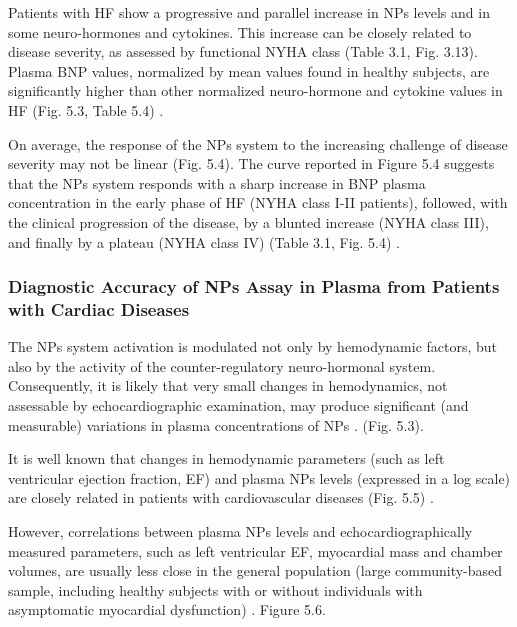 \documentclass[14pt,a4paper,onecolumn]{extarticle}
\begin{document}
Patients with HF show a progressive and parallel increase in NPs levels and in some neuro-hormones and cytokines. This increase can be closely related to disease severity, as assessed by functional NYHA class (Table 3.1, Fig. 3.13). Plasma BNP values, normalized by mean values found in healthy subjects, are significantly higher than other normalized neuro-hormone and cytokine values in HF (Fig. 5.3, Table 5.4) \citep{bib360}.



On average, the response of the NPs system to the increasing challenge of disease severity may not be linear (Fig. 5.4). The curve reported in Figure 5.4 suggests that the NPs system responds with a sharp increase in BNP plasma concentration in the early phase of HF (NYHA class I-II patients), followed, with the clinical progression of the disease, by a blunted increase (NYHA class III), and finally by a plateau (NYHA class IV) (Table 3.1, Fig. 5.4) \citep{bib333}.



\subsubsection{ Diagnostic Accuracy of NPs Assay in Plasma from Patients with Cardiac Diseases}



The NPs system activation is modulated not only by hemodynamic factors, but also by the activity of the counter-regulatory neuro-hormonal system. Consequently, it is likely that very small changes in hemodynamics, not assessable by echocardiographic examination, may produce significant (and measurable) variations in plasma concentrations of NPs \citep{bib360}. (Fig. 5.3).



It is well known that changes in hemodynamic parameters (such as left ventricular ejection fraction, EF) and plasma NPs levels (expressed in a log scale) are closely related in patients with cardiovascular diseases (Fig. 5.5) \citep{bib32} \citep{bib33} \citep{bib34} \citep{bib35}  \citep{bib360} \citep{bib363} \citep{bib364}.



However, correlations between plasma NPs levels and echocardiographically measured parameters, such as left ventricular EF, myocardial mass and chamber volumes, are usually less close in the general population (large community-based sample, including healthy subjects with or without individuals with asymptomatic myocardial dysfunction) \citep{bib38} \citep{bib39} \citep{bib366} \citep{bib367}. Figure 5.6.
\end{document}
